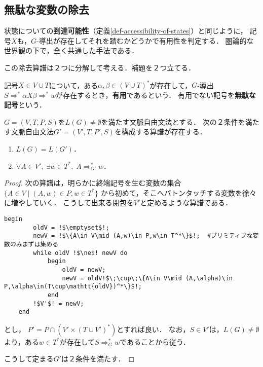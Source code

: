 \documentclass[uplatex, dvipdfmx]{jsreport}
\begin{document}
\subsection{無駄な変数の除去}

\begin{tcolorbox}[colframe=ForestGreen, colback=ForestGreen!10!white, breakable]
    状態についての\textbf{到達可能性}（定義\ref{def-accessibility-of-states}）と同じように，
    記号$X$も，$G$-導出が存在してそれを踏むかどうかで有用性を判定する．
    圏論的な世界観の下で，全く共通した手法である．

    この除去算譜は２つに分解して考える．補題を２つ立てる．
\end{tcolorbox}

\begin{definition}[usefulness]
    記号$X\in V\cup T$について，ある$\alpha,\beta\in(V\cup T)^*$が存在して，$G$-導出$S\Rightarrow^*\alpha X\beta\Rightarrow^*w$が存在するとき，\textbf{有用}であるという．
    有用でない記号を\textbf{無駄な記号}という．
\end{definition}

\begin{lemma}[終端記号を導出しない変数の除去算譜]\label{lemma-algorithm1-unuseful-characters}
    $G=(V,T,P,S)$を$L(G)\ne\emptyset$を満たす文脈自由文法とする．
    次の２条件を満たす文脈自由文法$G'=(V',T,P',S)$を構成する算譜が存在する．
    \begin{enumerate}
        \item $L(G)=L(G')$．
        \item $\forall A\in V',\;\exists w\in T^*,\;A\Rightarrow^*_{G'}w$．
    \end{enumerate}
\end{lemma}
\begin{proof}
    次の算譜は，明らかに終端記号を生む変数の集合$\{A\in V\mid (A,w)\in P,w\in T^*\}$
    から初めて，そこへバトンタッチする変数を徐々に増やしていく．
    こうして出来る閉包を$V'$と定めるような算譜である．
    \begin{lstlisting}[escapechar=!]
    begin
        oldV = !$\emptyset$!;
        newV = !$\{A\in V\mid (A,w)\in P,w\in T^*\}$!;  #プリミティブな変数のみまずは集める
        while oldV !$\ne$! newV do
            begin
                oldV = newV;
                newV = oldV!$\;\cup\;\{A\in V\mid (A,\alpha)\in P,\alpha\in(T\cup\mathtt{oldV})^*\}$!;
            end
        !$V'$! = newV;
    end
    \end{lstlisting}
    とし，
    $P'=P\cap(V'\times(T\cup V')^*)$とすれば良い．
    なお，$S\in V'$は，$L(G)\ne\emptyset$より，ある$w\in T^*$が存在して$S\Rightarrow^*_{G} w$であることから従う．

    こうして定まる$G'$は２条件を満たす．
\end{proof}
\end{document}
